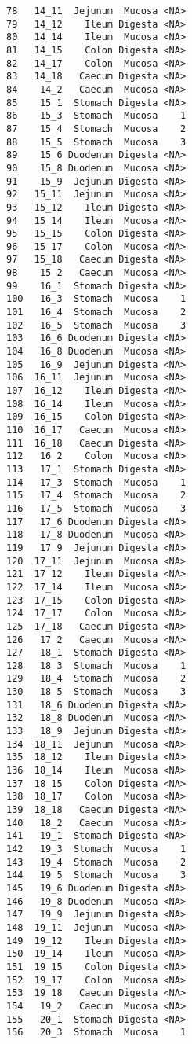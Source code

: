 \documentclass[
  letterpaper,
  DIV=11,
  numbers=noendperiod]{scrartcl}
\begin{document}
\begin{verbatim}
78   14_11  Jejunum  Mucosa <NA>
79   14_12    Ileum Digesta <NA>
80   14_14    Ileum  Mucosa <NA>
81   14_15    Colon Digesta <NA>
82   14_17    Colon  Mucosa <NA>
83   14_18   Caecum Digesta <NA>
84    14_2   Caecum  Mucosa <NA>
85    15_1  Stomach Digesta <NA>
86    15_3  Stomach  Mucosa    1
87    15_4  Stomach  Mucosa    2
88    15_5  Stomach  Mucosa    3
89    15_6 Duodenum Digesta <NA>
90    15_8 Duodenum  Mucosa <NA>
91    15_9  Jejunum Digesta <NA>
92   15_11  Jejunum  Mucosa <NA>
93   15_12    Ileum Digesta <NA>
94   15_14    Ileum  Mucosa <NA>
95   15_15    Colon Digesta <NA>
96   15_17    Colon  Mucosa <NA>
97   15_18   Caecum Digesta <NA>
98    15_2   Caecum  Mucosa <NA>
99    16_1  Stomach Digesta <NA>
100   16_3  Stomach  Mucosa    1
101   16_4  Stomach  Mucosa    2
102   16_5  Stomach  Mucosa    3
103   16_6 Duodenum Digesta <NA>
104   16_8 Duodenum  Mucosa <NA>
105   16_9  Jejunum Digesta <NA>
106  16_11  Jejunum  Mucosa <NA>
107  16_12    Ileum Digesta <NA>
108  16_14    Ileum  Mucosa <NA>
109  16_15    Colon Digesta <NA>
110  16_17   Caecum  Mucosa <NA>
111  16_18   Caecum Digesta <NA>
112   16_2    Colon  Mucosa <NA>
113   17_1  Stomach Digesta <NA>
114   17_3  Stomach  Mucosa    1
115   17_4  Stomach  Mucosa    2
116   17_5  Stomach  Mucosa    3
117   17_6 Duodenum Digesta <NA>
118   17_8 Duodenum  Mucosa <NA>
119   17_9  Jejunum Digesta <NA>
120  17_11  Jejunum  Mucosa <NA>
121  17_12    Ileum Digesta <NA>
122  17_14    Ileum  Mucosa <NA>
123  17_15    Colon Digesta <NA>
124  17_17    Colon  Mucosa <NA>
125  17_18   Caecum Digesta <NA>
126   17_2   Caecum  Mucosa <NA>
127   18_1  Stomach Digesta <NA>
128   18_3  Stomach  Mucosa    1
129   18_4  Stomach  Mucosa    2
130   18_5  Stomach  Mucosa    3
131   18_6 Duodenum Digesta <NA>
132   18_8 Duodenum  Mucosa <NA>
133   18_9  Jejunum Digesta <NA>
134  18_11  Jejunum  Mucosa <NA>
135  18_12    Ileum Digesta <NA>
136  18_14    Ileum  Mucosa <NA>
137  18_15    Colon Digesta <NA>
138  18_17    Colon  Mucosa <NA>
139  18_18   Caecum Digesta <NA>
140   18_2   Caecum  Mucosa <NA>
141   19_1  Stomach Digesta <NA>
142   19_3  Stomach  Mucosa    1
143   19_4  Stomach  Mucosa    2
144   19_5  Stomach  Mucosa    3
145   19_6 Duodenum Digesta <NA>
146   19_8 Duodenum  Mucosa <NA>
147   19_9  Jejunum Digesta <NA>
148  19_11  Jejunum  Mucosa <NA>
149  19_12    Ileum Digesta <NA>
150  19_14    Ileum  Mucosa <NA>
151  19_15    Colon Digesta <NA>
152  19_17    Colon  Mucosa <NA>
153  19_18   Caecum Digesta <NA>
154   19_2   Caecum  Mucosa <NA>
155   20_1  Stomach Digesta <NA>
156   20_3  Stomach  Mucosa    1

\end{verbatim}
\end{document}
